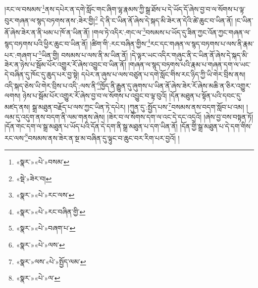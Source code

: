 །རང་ལ་བསམས་\footnote{«སྣར་»«པེ་»བསམ་}ནས་དཔེར་ན་དགེ་སློང་གང་ཞིག་ལྷ་རྣམས་ཀྱི་སྒྲ་ཐོས་པ་དེ་ཡོད་དོ་ཞེས་བྱ་བ་ལ་སོགས་པ་ལྟ་བུར་གཞན་ལ་སྙད་བཏགས་ནས་:ཟེར་གྱི།\footnote{«སྡེ་»ཟེར་བ།} དེ་ནི་ང་ཡིན་ནོ་ཞེས་དེ་སྐད་མི་ཟེར་ན་དེའི་ཚེ་ཆུང་བ་ཡིན་ནོ། །ང་ཡིན་ནོ་ཞེས་ཟེར་ན་ནི་ཕམ་པ་ཁོ་ན་ཡིན་ནོ། །གལ་ཏེ་འདིར་:གང་ལ་\footnote{«སྣར་»«པེ་»རང་ལས་}བསམས་པ་ཡོད་དུ་ཟིན་ཀྱང་འོན་ཀྱང་གཞན་ལ་སྙད་བཏགས་པའི་ཕྱིར་ཆུང་བ་ཡིན་ནོ། །ཚིག་གི་:རང་བཞིན་གྱིས་\footnote{«སྣར་»«པེ་»རང་བཞིན་གྱི་}རང་དང་གཞན་ལ་སྙད་བཏགས་པ་ལས་ནི་རྣམ་པར་:གཞག་པ་\footnote{«སྣར་»«པེ་»བཞག་པ་}ཡིན་གྱི། བསམས་པ་ལས་ནི་མ་ཡིན་ནོ། །དེ་ལྟར་ཡང་འདིར་གཞུང་ནི་ང་ཡིན་ནོ་ཞེས་དེ་སྐད་མི་ཟེར་ན་ཉེས་པ་སྦོམ་པོར་འགྱུར་རོ་ཞེས་འབྱུང་བ་ཡིན་ནོ། །གཞན་ལ་སྙད་བཏགས་པའི་རྣམ་པ་གཞན་དག་ལ་ཡང་དེ་བཞིན་དུ་ཁོང་དུ་ཆུད་པར་བྱ་སྟེ། དཔེར་ན་ཞུས་པ་ལས་བཙུན་པ་དགེ་སློང་གིས་རང་ཉིད་ཀྱི་ཡི་གེར་བྲིས་ནས། འདི་སྐད་ཅེས་ཡི་གེར་བྲིས་པ་འདི་:ལས་ནི་\footnote{«སྣར་»«པེ་»ལས་}ཁྱོད་ནི་རྒྱུན་དུ་ཞུགས་པ་ཡིན་ནོ་ཞེས་ཟེར་རོ་ཞེས་མཆི་ན་ཅིར་འགྱུར་ལགས། ཉེས་པ་སྦོམ་པོར་འགྱུར་རོ་ཞེས་བྱ་བ་ལ་སོགས་པ་འབྱུང་བ་ལྟ་བུའོ། །དོན་མཐུན་པ་སྟོན་པའི་དབང་དུ་མཛད་ནས། སྒྲ་མཐུན་བརྗོད་པ་ལས་ཀྱང་ཡིན་ཏེ་དཔེར། །ཀུན་དུ་:སྤྱོད་པས་\footnote{«སྣར་»ལས་«པེ་»སྤྱོད་ལམ་}བསམས་ནས་བདག་སློབ་པ་འམ། །ལམ་དུ་འདུག་ནས་བདག་ནི་ལམ་གནས་ཞེས། །ཟེར་བ་ལ་སོགས་དག་ལ་འང་དེ་དང་འདྲའོ། །ཞེས་བྱ་བས་བསྟན་ཏོ། །དོན་གང་དག་ལ་སྒྲ་མཐུན་པ་ཡོད་པའི་དོན་དེ་དག་ནི་སྒྲ་མཐུན་པ་དག་ཡིན་ནོ། །དོན་གྱི་སྒྲ་མཐུན་པ་དེ་དག་གིས་རང་ལས་\footnote{«སྣར་»«པེ་»ལ་}བསམས་ནས་ཟེར་ན་སྔ་མ་བཞིན་དུ་ལྟུང་བ་ཆུང་བར་རིག་པར་བྱའོ། །
